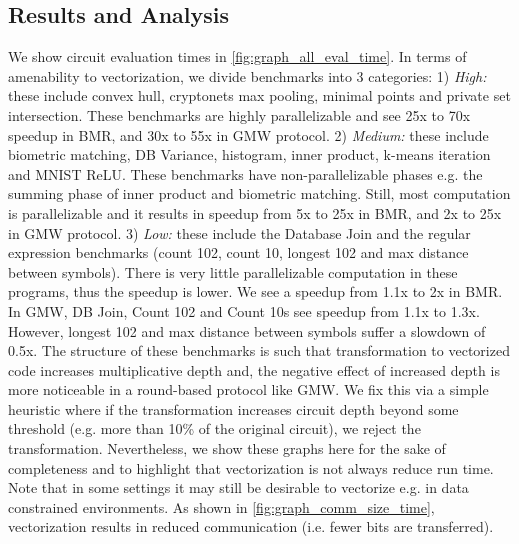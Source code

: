 \subsection{Results and Analysis}\label{sec:result_analysis}

\begin{figure*}[htbp]
\centering

\caption{Circuit Evaluation Time (Setup + Online) of Benchmarks}
\label{fig:graph_all_eval_time}
\end{figure*}

We show circuit evaluation times in \cref{fig:graph_all_eval_time}. In terms of amenability to vectorization, we divide benchmarks into 3 categories: 1) {\it High:} these include convex hull, cryptonets max pooling, minimal points and private set intersection. These benchmarks are highly parallelizable and see 25x to 70x speedup in BMR, and 30x to 55x in GMW protocol. 2) {\it Medium:} these include biometric matching, DB Variance, histogram, inner product, k-means iteration and MNIST ReLU. These benchmarks have non-parallelizable phases e.g. the summing phase of inner product and biometric matching. Still, most computation is parallelizable and it results in speedup from 5x to 25x in BMR, and 2x to 25x in GMW protocol. 3) {\it Low:} these include the Database Join and the regular expression benchmarks (count 102, count 10, longest 102 and max distance between symbols). There is very little parallelizable computation in these programs, thus the speedup is lower. We see a speedup from 1.1x to 2x in BMR. In GMW, DB Join, Count 102 and Count 10s see speedup from 1.1x to 1.3x. However, longest 102 and max distance between symbols suffer a slowdown of 0.5x. The structure of these benchmarks is such that transformation to vectorized code increases multiplicative depth and, the negative effect of increased depth is more noticeable in a round-based protocol like GMW. We fix this via a simple heuristic where if the transformation increases circuit depth beyond some threshold (e.g. more than 10\% of the original circuit), we reject the transformation. Nevertheless, we show these graphs here for the sake of completeness and to highlight that vectorization is not always reduce run time. Note that in some settings it may still be desirable to vectorize e.g. in data constrained environments. As shown in \cref{fig:graph_comm_size_time}, vectorization results in reduced communication (i.e. fewer bits are transferred).

